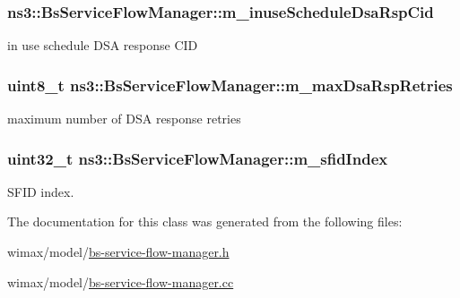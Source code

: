 \subsubsection[{\texorpdfstring{m\+\_\+inuse\+Schedule\+Dsa\+Rsp\+Cid}{m_inuseScheduleDsaRspCid}}]{ ns3\+::\+Bs\+Service\+Flow\+Manager\+::m\+\_\+inuse\+Schedule\+Dsa\+Rsp\+Cid\hspace{0.3cm}{\ttfamily [private]}}\hypertarget{classns3_1_1BsServiceFlowManager_a5bb3b84ebe38fc20af15f618add2227a}{}\label{classns3_1_1BsServiceFlowManager_a5bb3b84ebe38fc20af15f618add2227a}


in use schedule D\+SA response C\+ID 

\subsubsection[{\texorpdfstring{m\+\_\+max\+Dsa\+Rsp\+Retries}{m_maxDsaRspRetries}}]{\setlength{\rightskip}{0pt plus 5cm}uint8\+\_\+t ns3\+::\+Bs\+Service\+Flow\+Manager\+::m\+\_\+max\+Dsa\+Rsp\+Retries\hspace{0.3cm}{\ttfamily [private]}}\hypertarget{classns3_1_1BsServiceFlowManager_a187563222d3a6b050019ba4e71f916d8}{}\label{classns3_1_1BsServiceFlowManager_a187563222d3a6b050019ba4e71f916d8}


maximum number of D\+SA response retries 

\subsubsection[{\texorpdfstring{m\+\_\+sfid\+Index}{m_sfidIndex}}]{\setlength{\rightskip}{0pt plus 5cm}uint32\+\_\+t ns3\+::\+Bs\+Service\+Flow\+Manager\+::m\+\_\+sfid\+Index\hspace{0.3cm}{\ttfamily [private]}}\hypertarget{classns3_1_1BsServiceFlowManager_af08f7e386d477d94d6ed94f39c692c4f}{}\label{classns3_1_1BsServiceFlowManager_af08f7e386d477d94d6ed94f39c692c4f}


S\+F\+ID index. 



The documentation for this class was generated from the following files\+:\begin{DoxyCompactItemize}
\item 
wimax/model/\hyperlink{bs-service-flow-manager_8h}{bs-\/service-\/flow-\/manager.\+h}\item 
wimax/model/\hyperlink{bs-service-flow-manager_8cc}{bs-\/service-\/flow-\/manager.\+cc}\end{DoxyCompactItemize}
